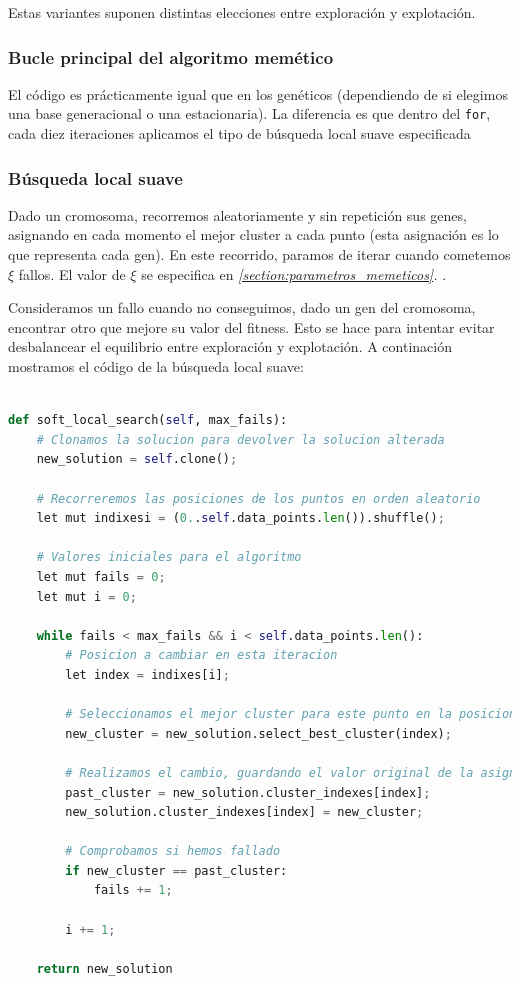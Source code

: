 \documentclass[11pt]{article}
\begin{document}
Estas variantes suponen distintas elecciones entre exploración y explotación.

\subsubsection{Bucle principal del algoritmo memético}

El código es prácticamente igual que en los genéticos (dependiendo de si elegimos una base generacional o una estacionaria). La diferencia es que dentro del \lstinline{for}, cada diez iteraciones aplicamos el tipo de búsqueda local suave especificada

\subsubsection{Búsqueda local suave}

Dado un cromosoma, recorremos aleatoriamente y sin repetición sus genes, asignando en cada momento el mejor cluster a cada punto (esta asignación es lo que representa cada gen). En este recorrido, paramos de iterar cuando cometemos $\xi$ fallos. El valor de $\xi$ se especifica en \emph{\ref{section:parametros_memeticos}. }.

Consideramos un fallo cuando no conseguimos, dado un gen del cromosoma, encontrar otro que mejore su valor del fitness. Esto se hace para intentar evitar desbalancear el equilibrio entre exploración y explotación. A continación mostramos el código de la búsqueda local suave:


\begin{lstlisting}[language=Python, style=Boxed]

def soft_local_search(self, max_fails):
    # Clonamos la solucion para devolver la solucion alterada
    new_solution = self.clone();

    # Recorreremos las posiciones de los puntos en orden aleatorio
    let mut indixesi = (0..self.data_points.len()).shuffle();

    # Valores iniciales para el algoritmo
    let mut fails = 0;
    let mut i = 0;

    while fails < max_fails && i < self.data_points.len():
        # Posicion a cambiar en esta iteracion
        let index = indixes[i];

        # Seleccionamos el mejor cluster para este punto en la posicion index
        new_cluster = new_solution.select_best_cluster(index);

        # Realizamos el cambio, guardando el valor original de la asignacion
        past_cluster = new_solution.cluster_indexes[index];
        new_solution.cluster_indexes[index] = new_cluster;

        # Comprobamos si hemos fallado
        if new_cluster == past_cluster:
            fails += 1;

        i += 1;

    return new_solution
\end{lstlisting}
\end{document}
